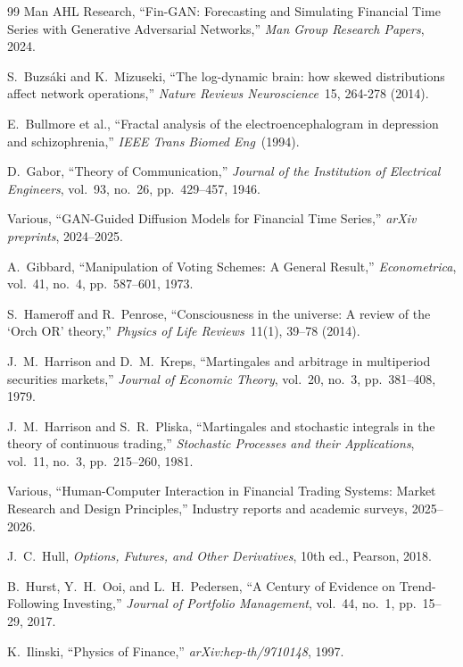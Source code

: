 \documentclass[12pt,oneside]{book}
\begin{document}
\begin{thebibliography}{99}
Man AHL Research,
``Fin-GAN: Forecasting and Simulating Financial Time Series with Generative Adversarial Networks,''
\emph{Man Group Research Papers}, 2024.

S.~Buzs\'aki and K.~Mizuseki, ``The log-dynamic brain: how skewed distributions affect network operations,'' \emph{Nature Reviews Neuroscience}\ 15, 264-278 (2014).

E.~Bullmore et al., ``Fractal analysis of the electroencephalogram in depression and schizophrenia,'' \emph{IEEE Trans Biomed Eng}\ (1994).

D.~Gabor,
``Theory of Communication,''
\emph{Journal of the Institution of Electrical Engineers}, vol.~93, no.~26, pp.~429--457, 1946.

Various,
``GAN-Guided Diffusion Models for Financial Time Series,''
\emph{arXiv preprints}, 2024--2025.

A.~Gibbard,
``Manipulation of Voting Schemes: A General Result,''
\emph{Econometrica}, vol.~41, no.~4, pp.~587--601, 1973.

S.~Hameroff and R.~Penrose, ``Consciousness in the universe: A review of the `Orch OR' theory,'' \emph{Physics of Life Reviews}\ 11(1), 39--78 (2014).

J.~M.~Harrison and D.~M.~Kreps,
``Martingales and arbitrage in multiperiod securities markets,''
\emph{Journal of Economic Theory}, vol.~20, no.~3, pp.~381--408, 1979.

J.~M.~Harrison and S.~R.~Pliska,
``Martingales and stochastic integrals in the theory of continuous trading,''
\emph{Stochastic Processes and their Applications}, vol.~11, no.~3, pp.~215--260, 1981.

Various,
``Human-Computer Interaction in Financial Trading Systems: Market Research and Design Principles,''
Industry reports and academic surveys, 2025--2026.

J.~C.~Hull,
\emph{Options, Futures, and Other Derivatives},
10th ed., Pearson, 2018.

B.~Hurst, Y.~H.~Ooi, and L.~H.~Pedersen,
``A Century of Evidence on Trend-Following Investing,''
\emph{Journal of Portfolio Management}, vol.~44, no.~1, pp.~15--29, 2017.

K.~Ilinski,
``Physics of Finance,''
\emph{arXiv:hep-th/9710148}, 1997.


\end{thebibliography}
\end{document}
